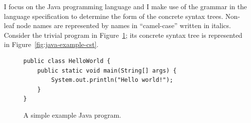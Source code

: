 I focus on the Java programming language and I make use of the grammar in the language specification \cite[][Chapter 18]{2012:book:gosling} to determine the form of the concrete syntax trees.  Non-leaf node names are represented by names in ``camel-case'' written in italics.  Consider the trivial program in Figure~\ref{fig:java-example}; its concrete syntax tree is represented in Figure~\ref{fig:java-example-cst}.

\begin{figure}
\begin{lstlisting}
public class HelloWorld {
    public static void main(String[] args) {
        System.out.println("Hello world!");
    }
}
\end{lstlisting}
\caption{A simple example Java program.\label{fig:java-example}}
\end{figure}


